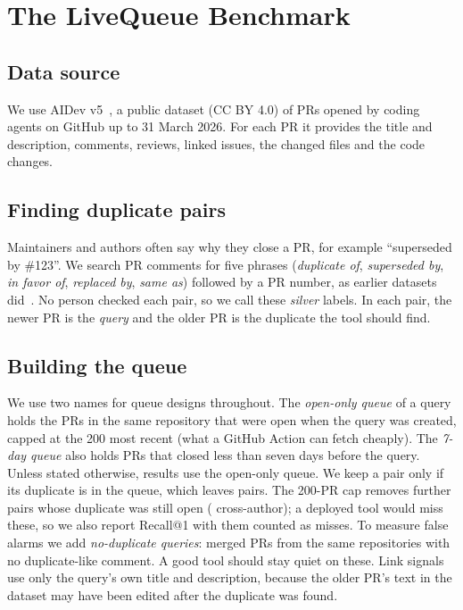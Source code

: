 \documentclass[10pt,conference]{IEEEtran}
\begin{document}
\section{The LiveQueue Benchmark}
\subsection{Data source}
We use AIDev v5~\cite{li2026aidev}, a public dataset (CC BY 4.0) of PRs opened by coding agents on GitHub up to 31 March 2026. For each PR it provides the title and description, comments, reviews, linked issues, the changed files and the code changes.

\subsection{Finding duplicate pairs}
Maintainers and authors often say why they close a PR, for example ``superseded by \#123''. We search PR comments for five phrases (\emph{duplicate of}, \emph{superseded by}, \emph{in favor of}, \emph{replaced by}, \emph{same as}) followed by a PR number, as earlier datasets did~\cite{yu2018dataset,galbraith2025duplicate}. No person checked each pair, so we call these \emph{silver} labels. In each pair, the newer PR is the \emph{query} and the older PR is the duplicate the tool should find.

\subsection{Building the queue}
We use two names for queue designs throughout. The \emph{open-only queue} of a query holds the PRs in the same repository that were open when the query was created, capped at the 200 most recent (what a GitHub Action can fetch cheaply). The \emph{7-day queue} also holds PRs that closed less than seven days before the query. Unless stated otherwise, results use the open-only queue. We keep a pair only if its duplicate is in the queue, which leaves \nPairs{} pairs. The 200-PR cap removes \capAll{} further pairs whose duplicate was still open (\capCross{} cross-author); a deployed tool would miss these, so we also report Recall@1 with them counted as misses. To measure false alarms we add \nNeg{} \emph{no-duplicate queries}: merged PRs from the same repositories with no duplicate-like comment. A good tool should stay quiet on these. Link signals use only the query's own title and description, because the older PR's text in the dataset may have been edited after the duplicate was found.
\end{document}
